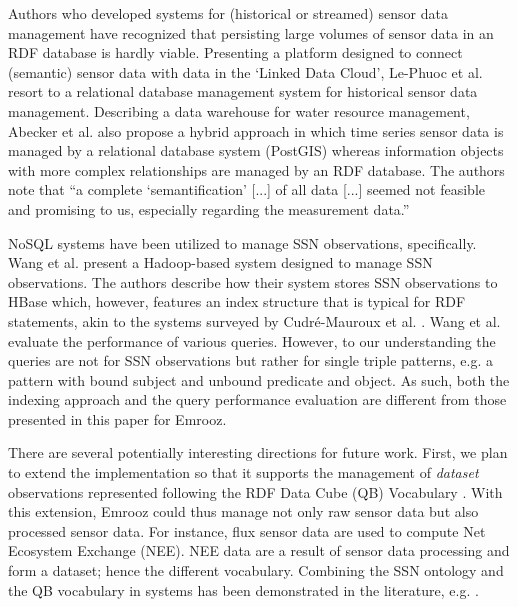 \documentclass[preprint,12pt,authoryear]{elsarticle}
\begin{document}
Authors who developed systems for (historical or streamed) sensor data management have recognized that persisting large volumes of sensor data in an RDF database is hardly viable. Presenting a platform designed to connect (semantic) sensor data with data in the `Linked Data Cloud', Le-Phuoc et al. \cite{phuoc11linked} resort to a relational database management system for historical sensor data management. Describing a data warehouse for water resource management, Abecker et al. \cite{abecker14sensor} also propose a hybrid approach in which time series sensor data is managed by a relational database system (PostGIS) whereas information objects with more complex relationships are managed by an RDF database. The authors note that ``a complete `semantification' [...] of all data [...] seemed not feasible and promising to us, especially regarding the measurement data.''

NoSQL systems have been utilized to manage SSN observations, specifically. Wang et al. \cite{wang14hdsw} present a Hadoop-based system designed to manage SSN observations. The authors describe how their system stores SSN observations to HBase which, however, features an index structure that is typical for RDF statements, akin to the systems surveyed by Cudr{\'e}-Mauroux et al. \cite{harith13nosql}. Wang et al. evaluate the performance of various queries. However, to our understanding the queries are not for SSN observations but rather for single triple patterns, e.g. a pattern with bound subject and unbound predicate and object. As such, both the indexing approach and the query performance evaluation are different from those presented in this paper for Emrooz.

There are several potentially interesting directions for future work. First, we plan to extend the implementation so that it supports the management of \emph{dataset} observations represented following the RDF Data Cube (QB) Vocabulary \cite{cyganiak13qb}. With this extension, Emrooz could thus manage not only raw sensor data but also processed sensor data. For instance,  flux sensor data are used to compute Net Ecosystem Exchange (NEE). NEE data are a result of sensor data processing and form a dataset; hence the different vocabulary. Combining the SSN ontology and the QB vocabulary in systems has been demonstrated in the literature, e.g. \cite{lefort12qb,stocker13ems}.
\end{document}

